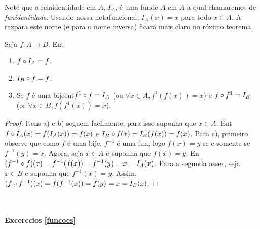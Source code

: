 Note que a rela\cao identidade em $A$, $I_A$, \'e uma fun\cao de $A$ em $A$ a qual chamaremos de {\it fun\cao identidade}. Usando nossa nota\cao funcional, $I_A(x)=x$ para todo $x\in A$. A raz\ao para este nome (e para o nome inversa) ficar\'a mais claro no r\'oximo teorema.
\begin{teob}\label{functeo17}
Seja $f:A\to B$. Ent\aoi
\begin{enumerate}[{\bf a)}]
\item $f\circ I_A=f$. 
\item $I_B\circ f=f$.
\item Se $f$ \'e uma bije\cao ent\ao $f^{1}\circ f=I_A$ (ou $\forall x\in A, f^{1}(f(x))=x$) e $f\circ f^{1}=I_B$ (or $\forall x\in B, f(f^{1}(x))=x$).
\end{enumerate}
\end{teob}
\begin{proof}
Itens a) e b) seguem facilmente, para isso suponha que $x\in A$. Ent\ao $f\circ I_A(x)=f(I_A(x))=f(x)$ e $I_B\circ f(x)=I_B(f(x))=f(x)$. Para c), primeiro observe que como $f$ \'e uma bije\caoi, $f^{-1}$ \'e uma fun\caoi, logo $f(x)=y$ se e somente se $f^{-1}(y)=x$. Agora, seja $x\in A$ e suponha que $f(x)=y$. En\tao $(f^{-1}\circ f)(x)=f^{-1}(f(x))=f^{-1}(y)=x=I_A(x)$. Para a segunda asser\caoi, seja $x\in B$ e suponha que $f^{-1}(x)=y$. Assim, $(f\circ f^{-1})(x)=f(f^{-1}(x))=f(y)=x=I_B(x)$.
\end{proof}
\\

\paragraph{Excerc\ih cios \ref{funcoes}}

